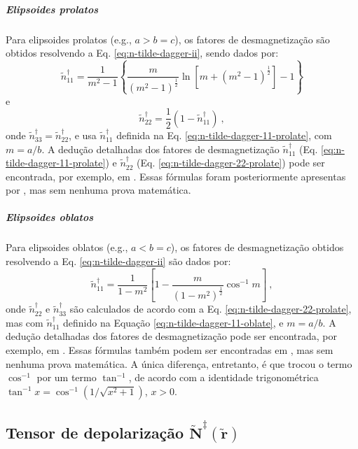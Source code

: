 \subparagraph*{Elipsoides prolatos}

Para elipsoides prolatos (e.g., $a > b = c$), os fatores de desmagnetização
são obtidos resolvendo a Eq. \ref{eq:n-tilde-dagger-ii}, sendo dados por:
\begin{equation}
\tilde{n}^{\dagger}_{11} = \frac{1}{m^{2} - 1}
\left\lbrace \frac{m}{\left( m^{2} - 1 \right)^{\frac{1}{2}}}
\ln \left[ m + \left( m^{2} - 1 \right)^{\frac{1}{2}} \right]
- 1 \right\rbrace
\label{eq:n-tilde-dagger-11-prolate}
\end{equation}
e
\begin{equation}
\tilde{n}^{\dagger}_{22} = \frac{1}{2} \left(1 - \tilde{n}^{\dagger}_{11} \right) \: ,
\label{eq:n-tilde-dagger-22-prolate}
\end{equation}
onde $\tilde{n}^{\dagger}_{33} = \tilde{n}^{\dagger}_{22}$, 
e usa $\tilde{n}^{\dagger}_{11}$ definida na 
Eq. \ref{eq:n-tilde-dagger-11-prolate}, com $m = a/b$.
A dedução detalhadas dos fatores de desmagnetização 
$\tilde{n}^{\dagger}_{11}$ (Eq. \ref{eq:n-tilde-dagger-11-prolate}) 
e $\tilde{n}^{\dagger}_{22}$ (Eq. \ref{eq:n-tilde-dagger-22-prolate})
pode ser encontrada, por exemplo, em \citet{stoner1945}. 
Essas fórmulas foram posteriormente apresentas por
\citet{emerson1985}, mas sem nenhuma prova matemática.

\subparagraph*{Elipsoides oblatos}

Para elipsoides oblatos (e.g., $a < b = c$), os fatores de desmagnetização
obtidos resolvendo a Eq. \ref{eq:n-tilde-dagger-ii} são dados por:
\begin{equation}
\tilde{n}^{\dagger}_{11} = 
\frac{1}{1 - m^{2}} \left[
1 - \frac{m}{\left( 1 - m^{2} \right)^{\frac{1}{2}}} \cos^{-1}m
\right] \: ,
\label{eq:n-tilde-dagger-11-oblate}
\end{equation}
onde $\tilde{n}^{\dagger}_{22}$ e $\tilde{n}^{\dagger}_{33}$ 
são calculados de acordo com a Eq.
\ref{eq:n-tilde-dagger-22-prolate}, mas com $\tilde{n}^{\dagger}_{11}$ 
definido na Equação \ref{eq:n-tilde-dagger-11-oblate}, 
e $m = a/b$.
A dedução detalhadas dos fatores de desmagnetização 
pode ser encontrada, por exemplo, em \citet{stoner1945}.  Essas fórmulas
também podem ser encontradas em \citet{emerson1985}, mas sem nenhuma prova matemática.
A única diferença, entretanto, é que \citet{emerson1985} trocou o termo $\cos^{-1}$
por um termo $\tan^{-1}$, de acordo com a identidade trigonométrica
$\tan^{-1}x = \cos^{-1}(1/\sqrt{x^{2} + 1})$, $x > 0$.

\subsection{Tensor de depolarização $\tilde{\mathbf{N}}^{\ddagger}(\tilde{\mathbf{r}})$}

